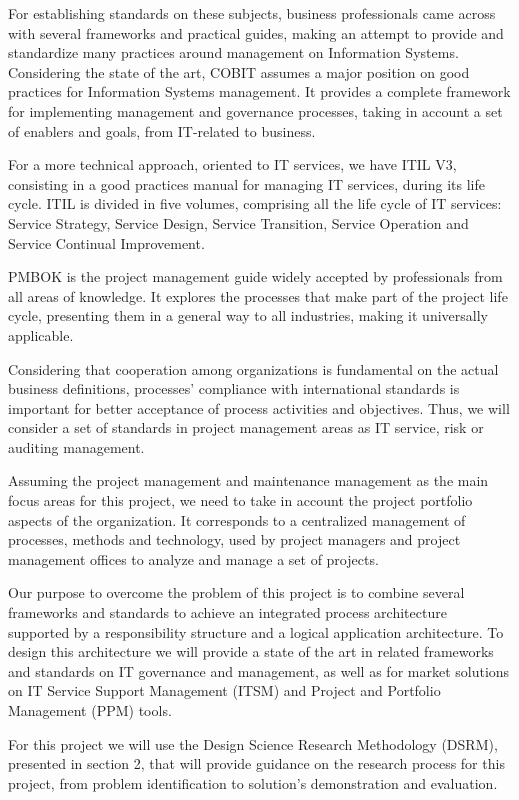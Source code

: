 For establishing standards on these subjects, business professionals came across with several frameworks and practical guides, making an attempt to provide and standardize many practices around management on Information Systems. Considering the state of the art, COBIT assumes a major position on good practices for Information Systems management. It provides a complete framework for implementing management and governance processes, taking in account a set of enablers and goals, from IT-related to business.\par
For a more technical approach, oriented to IT services, we have ITIL V3, consisting in a good practices manual for managing IT services, during its life cycle. ITIL is divided in five volumes, comprising all the life cycle of IT services: Service Strategy, Service Design, Service Transition, Service Operation and Service Continual Improvement.\par
PMBOK is the project management guide widely accepted by professionals from all areas of knowledge. It explores the processes that make part of the project life cycle, presenting them in a general way to all industries, making it universally applicable.\par
Considering that cooperation among organizations is fundamental on the actual business definitions, processes' compliance with international standards is important for better acceptance of process activities and objectives. Thus, we will consider a set of standards in project management areas as IT service, risk or auditing management.\par   
Assuming the project management and maintenance management as the main focus areas for this project, we need to take in account the project portfolio aspects of the organization. It corresponds to a centralized management of processes, methods and technology, used by project managers and project management offices to analyze and manage a set of projects.\par
Our purpose to overcome the problem of this project is to combine several frameworks and standards to achieve an integrated process architecture supported by a responsibility structure and a logical application architecture. To design this architecture we will provide a state of the art in related frameworks and standards on IT governance and management, as well as for market solutions on IT Service Support Management (ITSM) and Project and Portfolio Management (PPM) tools.\par
For this project we will use the Design Science Research Methodology (DSRM)\cite{DSRM}, presented in section 2, that will provide guidance on the research process for this project, from problem identification to solution's demonstration and evaluation.\par